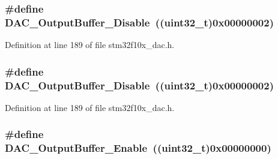 \subsubsection[{\texorpdfstring{D\+A\+C\+\_\+\+Output\+Buffer\+\_\+\+Disable}{DAC_OutputBuffer_Disable}}]{\setlength{\rightskip}{0pt plus 5cm}\#define D\+A\+C\+\_\+\+Output\+Buffer\+\_\+\+Disable~(({\bf uint32\+\_\+t})0x00000002)}\hypertarget{group___d_a_c__output__buffer_gad41f919d7141398cfdedf8218ce64450}{}\label{group___d_a_c__output__buffer_gad41f919d7141398cfdedf8218ce64450}


Definition at line 189 of file stm32f10x\+\_\+dac.\+h.

\subsubsection[{\texorpdfstring{D\+A\+C\+\_\+\+Output\+Buffer\+\_\+\+Disable}{DAC_OutputBuffer_Disable}}]{\setlength{\rightskip}{0pt plus 5cm}\#define D\+A\+C\+\_\+\+Output\+Buffer\+\_\+\+Disable~(({\bf uint32\+\_\+t})0x00000002)}\hypertarget{group___d_a_c__output__buffer_gad41f919d7141398cfdedf8218ce64450}{}\label{group___d_a_c__output__buffer_gad41f919d7141398cfdedf8218ce64450}


Definition at line 189 of file stm32f10x\+\_\+dac.\+h.

\subsubsection[{\texorpdfstring{D\+A\+C\+\_\+\+Output\+Buffer\+\_\+\+Enable}{DAC_OutputBuffer_Enable}}]{\setlength{\rightskip}{0pt plus 5cm}\#define D\+A\+C\+\_\+\+Output\+Buffer\+\_\+\+Enable~(({\bf uint32\+\_\+t})0x00000000)}\hypertarget{group___d_a_c__output__buffer_gab3f92803a8b6bc5fb3e4859908b5161f}{}\label{group___d_a_c__output__buffer_gab3f92803a8b6bc5fb3e4859908b5161f}


